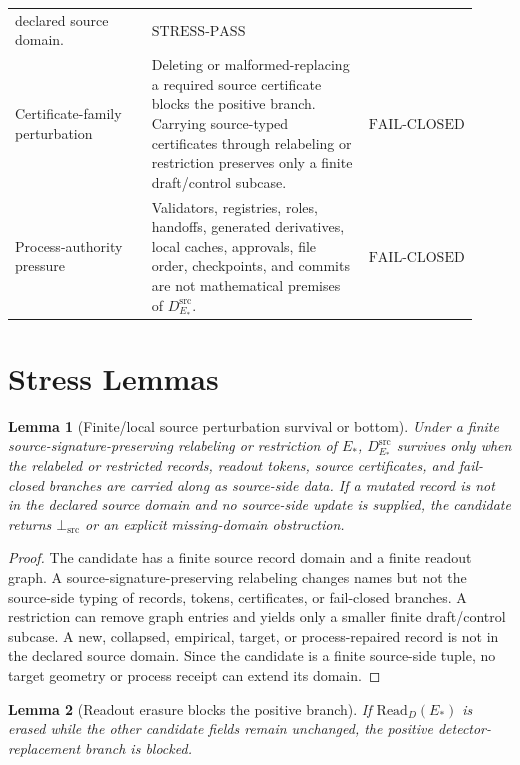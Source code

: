 \documentclass[11pt]{article}
\newcommand{\EStar}{E_{\ast}}
\newcommand{\DSrc}{D^{\mathrm{src}}_{E_{\ast}}}
\newcommand{\ReadD}{\mathrm{Read}_{D}(E_{\ast})}
\newcommand{\BottomSrc}{\bot_{\mathrm{src}}}
\newcommand{\StressPass}{\mathrm{STRESS}\mbox{-}\mathrm{PASS}}
\newcommand{\FailClosed}{\mathrm{FAIL}\mbox{-}\mathrm{CLOSED}}
\newtheorem{lemma}{Lemma}
\begin{document}
\begin{longtable}{p{0.30\linewidth}p{0.48\linewidth}p{0.14\linewidth}}
declared source domain. & \(\StressPass\) \\
Certificate-family perturbation &
Deleting or malformed-replacing a required source certificate blocks the
positive branch. Carrying source-typed certificates through relabeling or
restriction preserves only a finite draft/control subcase. & \(\FailClosed\) \\
Process-authority pressure &
Validators, registries, roles, handoffs, generated derivatives, local caches,
approvals, file order, checkpoints, and commits are not mathematical premises
of \(\DSrc\). & \(\FailClosed\) \\
\bottomrule
\end{longtable}

\section{Stress Lemmas}

\begin{lemma}[Finite/local source perturbation survival or bottom]
Under a finite source-signature-preserving relabeling or restriction of
\(\EStar\), \(\DSrc\) survives only when the relabeled or restricted records,
readout tokens, source certificates, and fail-closed branches are carried
along as source-side data. If a mutated record is not in the declared source
domain and no source-side update is supplied, the candidate returns
\(\BottomSrc\) or an explicit missing-domain obstruction.
\end{lemma}

\begin{proof}
The candidate has a finite source record domain and a finite readout graph.
A source-signature-preserving relabeling changes names but not the source-side
typing of records, tokens, certificates, or fail-closed branches. A
restriction can remove graph entries and yields only a smaller finite
draft/control subcase. A new, collapsed, empirical, target, or process-repaired
record is not in the declared source domain. Since the candidate is a finite
source-side tuple, no target geometry or process receipt can extend its
domain.
\end{proof}

\begin{lemma}[Readout erasure blocks the positive branch]
If \(\ReadD\) is erased while the other candidate fields remain unchanged,
the positive detector-replacement branch is blocked.
\end{lemma}
\end{document}
